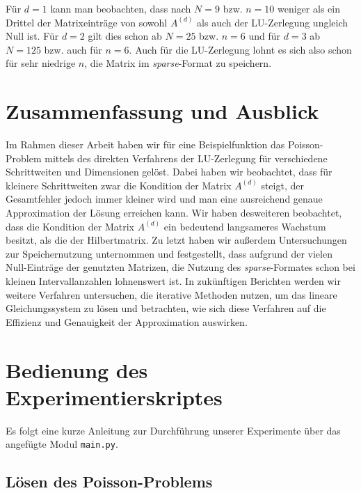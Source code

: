 \documentclass{scrartcl}
\begin{document}
Für $d=1$ kann man beobachten, dass nach $N=9$ bzw. $n=10$  weniger als ein Drittel der Matrixeinträge von sowohl $A^{(d)}$ als auch der LU-Zerlegung ungleich Null ist.
Für $d=2$ gilt dies schon ab $N=25$ bzw. $n=6$ und für $d=3$ ab $N = 125$ bzw. auch für $n=6$.
Auch für die LU-Zerlegung lohnt es sich also schon für sehr niedrige $n$, die Matrix im \textit{sparse}-Format zu speichern.

\section{Zusammenfassung und Ausblick}
Im Rahmen dieser Arbeit haben wir für eine Beispielfunktion das Poisson-Problem mittels des direkten Verfahrens der LU-Zerlegung für verschiedene Schrittweiten und Dimensionen gelöst.
Dabei haben wir beobachtet, dass für kleinere Schrittweiten zwar die Kondition der Matrix $A^{(d)}$ steigt, der Gesamtfehler jedoch immer kleiner wird und man eine ausreichend genaue Approximation der Lösung erreichen kann.
Wir haben desweiteren beobachtet, dass die Kondition der Matrix $A^{(d)}$ ein bedeutend langsameres Wachstum besitzt, als die der Hilbertmatrix.
Zu letzt haben wir außerdem Untersuchungen zur Speichernutzung unternommen und festgestellt, dass aufgrund der vielen Null-Einträge der genutzten Matrizen, die Nutzung des \textit{sparse}-Formates schon bei kleinen Intervallanzahlen lohnenswert ist.
In zukünftigen Berichten werden wir weitere Verfahren untersuchen, die iterative Methoden nutzen, um das lineare Gleichungssystem zu lösen und betrachten, wie sich diese Verfahren auf die Effizienz und Genauigkeit der Approximation auswirken.

\pagebreak




\appendix

\pagebreak

\section{Bedienung des Experimentierskriptes}

Es folgt eine kurze Anleitung zur Durchführung unserer Experimente über das angefügte Modul \texttt{main.py}.

\subsection{Lösen des Poisson-Problems}
\end{document}
